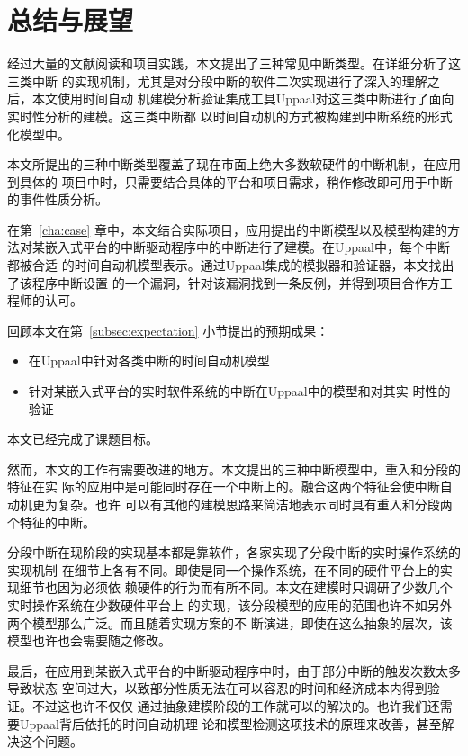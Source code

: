 
\chapter{总结与展望}
\label{cha:sum}

经过大量的文献阅读和项目实践，本文提出了三种常见中断类型。在详细分析了这三类中断
的实现机制，尤其是对分段中断的软件二次实现进行了深入的理解之后，本文使用时间自动
机建模分析验证集成工具Uppaal对这三类中断进行了面向实时性分析的建模。这三类中断都
以时间自动机的方式被构建到中断系统的形式化模型中。

本文所提出的三种中断类型覆盖了现在市面上绝大多数软硬件的中断机制，在应用到具体的
项目中时，只需要结合具体的平台和项目需求，稍作修改即可用于中断的事件性质分析。

在第~\ref{cha:case} 章中，本文结合实际项目，应用提出的中断模型以及模型构建的方
法对某嵌入式平台的中断驱动程序中的中断进行了建模。在Uppaal中，每个中断都被合适
的时间自动机模型表示。通过Uppaal集成的模拟器和验证器，本文找出了该程序中断设置
的一个漏洞，针对该漏洞找到一条反例，并得到项目合作方工程师的认可。

回顾本文在第~\ref{subsec:expectation} 小节提出的预期成果：

\begin{itemize}
	\item 在Uppaal中针对各类中断的时间自动机模型
	\item 针对某嵌入式平台的实时软件系统的中断在Uppaal中的模型和对其实
	时性的验证
\end{itemize}

本文已经完成了课题目标。

然而，本文的工作有需要改进的地方。本文提出的三种中断模型中，重入和分段的特征在实
际的应用中是可能同时存在一个中断上的。融合这两个特征会使中断自动机更为复杂。也许
可以有其他的建模思路来简洁地表示同时具有重入和分段两个特征的中断。

分段中断在现阶段的实现基本都是靠软件，各家实现了分段中断的实时操作系统的实现机制
在细节上各有不同。即使是同一个操作系统，在不同的硬件平台上的实现细节也因为必须依
赖硬件的行为而有所不同。本文在建模时只调研了少数几个实时操作系统在少数硬件平台上
的实现，该分段模型的应用的范围也许不如另外两个模型那么广泛。而且随着实现方案的不
断演进，即使在这么抽象的层次，该模型也许也会需要随之修改。

最后，在应用到某嵌入式平台的中断驱动程序中时，由于部分中断的触发次数太多导致状态
空间过大，以致部分性质无法在可以容忍的时间和经济成本内得到验证。不过这也许不仅仅
通过抽象建模阶段的工作就可以的解决的。也许我们还需要Uppaal背后依托的时间自动机理
论和模型检测这项技术的原理来改善，甚至解决这个问题。

